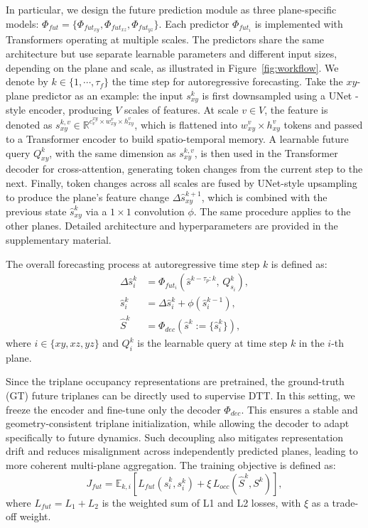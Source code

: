\documentclass[11pt,a4paper]{article}
\begin{document}
In particular, we design the future prediction module as three plane-specific models: $\Phi_{fut} = \{\Phi_{fut_{xy}}, \Phi_{fut_{xz}}, \Phi_{fut_{yz}}\}$.
Each predictor $\Phi_{fut_i}$ is implemented with Transformers \cite{ashishvaswani2017} operating at multiple scales.
The predictors share the same architecture but use separate learnable parameters and different input sizes, depending on the plane and scale, as illustrated in Figure~\ref{fig:workflow}.
We denote by $k \in \{1, \cdots, \tau_f\}$ the time step for autoregressive forecasting.
Take the $xy$-plane predictor as an example: the input $s^k_{xy}$ is first downsampled using a UNet \cite{olafronneberger2015}-style encoder, producing $V$ scales of features.
At scale $v \in V$, the feature is denoted as $s^{k,v}_{xy} \in \mathbb{R}^{c_v^{xy} \times w^v_{xy} \times h^v_{xy}}$, which is flattened into $w^v_{xy} \times h^v_{xy}$ tokens and passed to a Transformer encoder to build spatio-temporal memory.
A learnable future query $Q^k_{xy}$, with the same dimension as $s^{k,v}_{xy}$, is then used in the Transformer decoder for cross-attention, generating token changes from the current step to the next.
Finally, token changes across all scales are fused by UNet-style upsampling to produce the plane's feature change $\Delta\hat{s}^{k+1}_{xy}$, which is combined with the previous state $\hat{s}^k_{xy}$ via a $1 \times 1$ convolution $\phi$.
The same procedure applies to the other planes.
Detailed architecture and hyperparameters are provided in the supplementary material.

The overall forecasting process at autoregressive time step $k$ is defined as:
\begin{align}
  \Delta\hat{s}^k_i &= \Phi_{fut_i}\!\left(\hat{s}^{k-\tau_p:k},\, Q^k_{s_i}\right), \label{eq:fut} \\
  \hat{s}^k_i &= \Delta\hat{s}^k_i + \phi(\hat{s}^{k-1}_i), \label{eq:update} \\
  \hat{S}^k &= \Phi_{dec}\!\left(\hat{s}^k := \{\hat{s}^k_i\}\right), \label{eq:decode}
\end{align}
where $i \in \{xy, xz, yz\}$ and $Q^k_i$ is the learnable query at time step $k$ in the $i$-th plane.

Since the triplane occupancy representations are pretrained, the ground-truth (GT) future triplanes can be directly used to supervise DTT.
In this setting, we freeze the encoder and fine-tune only the decoder $\Phi_{dec}$.
This ensures a stable and geometry-consistent triplane initialization, while allowing the decoder to adapt specifically to future dynamics.
Such decoupling also mitigates representation drift and reduces misalignment across independently predicted planes, leading to more coherent multi-plane aggregation.
The training objective is defined as:
\begin{equation}
  J_{fut} = \mathbb{E}_{k,i}\!\left[ L_{fut}(\hat{s}^k_i, s^k_i) + \xi\, L_{occ}(\hat{S}^k, S^k) \right],
  \label{eq:jfut}
\end{equation}
where $L_{fut} = L_1 + L_2$ is the weighted sum of L1 and L2 losses, with $\xi$ as a trade-off weight.
\end{document}
